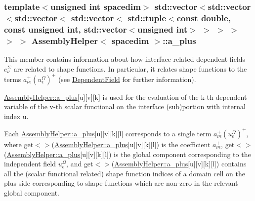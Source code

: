 \subsubsection[{\texorpdfstring{a\+\_\+plus}{a_plus}}]{\setlength{\rightskip}{0pt plus 5cm}template$<$unsigned int spacedim$>$ std\+::vector$<$std\+::vector$<$std\+::vector$<$ std\+::vector$<$ std\+::tuple$<$const double, const unsigned int, std\+::vector$<$unsigned int$>$ $>$ $>$ $>$ $>$ $>$ {\bf Assembly\+Helper}$<$ spacedim $>$\+::a\+\_\+plus\hspace{0.3cm}{\ttfamily [private]}}\hypertarget{class_assembly_helper_a8eb513a6239d94cc0f1a6a01a037c572}{}\label{class_assembly_helper_a8eb513a6239d94cc0f1a6a01a037c572}
This member contains information about how interface related dependent fields $e^\Sigma_\nu$ are related to shape functions. In particular, it relates shape functions to the terms $a^+_{\nu\epsilon} (u^\Omega_\epsilon)^+$ (see \hyperlink{class_dependent_field}{Dependent\+Field} for further information).

\hyperlink{class_assembly_helper_a8eb513a6239d94cc0f1a6a01a037c572}{Assembly\+Helper\+::a\+\_\+plus}\mbox{[}{\ttfamily u}\mbox{]}\mbox{[}{\ttfamily v}\mbox{]}\mbox{[}{\ttfamily k}\mbox{]} is used for the evaluation of the {\ttfamily k-\/th} dependent variable of the {\ttfamily v-\/th} scalar functional on the interface (sub)portion with internal index {\ttfamily u}.

Each \hyperlink{class_assembly_helper_a8eb513a6239d94cc0f1a6a01a037c572}{Assembly\+Helper\+::a\+\_\+plus}\mbox{[}{\ttfamily u}\mbox{]}\mbox{[}{\ttfamily v}\mbox{]}\mbox{[}{\ttfamily k}\mbox{]}\mbox{[}{\ttfamily l}\mbox{]} corresponds to a single term $a^+_{\nu\epsilon} (u^\Omega_\epsilon)^+$, where {\ttfamily get$<${$>$}(\hyperlink{class_assembly_helper_a8eb513a6239d94cc0f1a6a01a037c572}{Assembly\+Helper\+::a\+\_\+plus}}\mbox{[}{\ttfamily u}\mbox{]}\mbox{[}{\ttfamily v}\mbox{]}\mbox{[}{\ttfamily k}\mbox{]}\mbox{[}{\ttfamily l}\mbox{]}) is the coefficient $a^+_{\nu\epsilon}$, {\ttfamily get$<${$>$}(\hyperlink{class_assembly_helper_a8eb513a6239d94cc0f1a6a01a037c572}{Assembly\+Helper\+::a\+\_\+plus}}\mbox{[}{\ttfamily u}\mbox{]}\mbox{[}{\ttfamily v}\mbox{]}\mbox{[}{\ttfamily k}\mbox{]}\mbox{[}{\ttfamily l}\mbox{]}) is the global component corresponding to the independent field $u^\Omega_\epsilon$, and {\ttfamily get$<${$>$}(\hyperlink{class_assembly_helper_a8eb513a6239d94cc0f1a6a01a037c572}{Assembly\+Helper\+::a\+\_\+plus}}\mbox{[}{\ttfamily u}\mbox{]}\mbox{[}{\ttfamily v}\mbox{]}\mbox{[}{\ttfamily k}\mbox{]}\mbox{[}{\ttfamily l}\mbox{]}) contains all the (scalar functional related) shape function indices of a domain cell on the plus side corresponding to shape functions which are non-\/zero in the relevant global component. 
